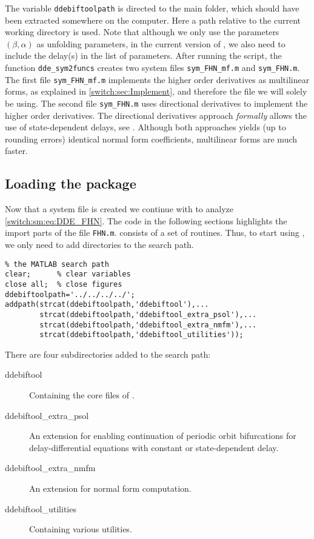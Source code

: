 The variable \lstinline|ddebiftoolpath| is directed to the \DDEBIFTOOL main folder, which should have been extracted somewhere on the computer. Here a path relative to the current working directory is used. Note that although we only use the parameters $(\beta,\alpha)$ as unfolding parameters, in the current version of \DDEBIFTOOL, we also need to include the delay(s) in the list of parameters. After running the script, the function \lstinline|dde_sym2funcs| creates two system files \lstinline|sym_FHN_mf.m| and \lstinline|sym_FHN.m|. The first file \lstinline|sym_FHN_mf.m| implements the higher order derivatives as multilinear forms, as explained in \cref{switch:sec:Implement}, and therefore the file we will solely be using. The second file \lstinline|sym_FHN.m| uses directional derivatives to implement the higher order derivatives. The directional derivatives approach \emph{formally} allows the use of state-dependent delays, see \cite{Sieber@2017}. Although both approaches yields (up to rounding errors) identical normal form coefficients, multilinear forms are much faster.

\subsection{Loading the \DDEBIFTOOL package}\label{switch:sm:sec:loading_DDE-BIFTool}
Now that a system file is created we continue with \DDEBIFTOOL to analyze \cref{switch:sm:eq:DDE_FHN}. The code in the following sections highlights the import parts of the file \lstinline|FHN.m|.
\DDEBIFTOOL consists of a set of \MATLAB routines. Thus, to start using \DDEBIFTOOL, we only need to add \DDEBIFTOOL directories to the search path.
\begin{lstlisting}[style=customMatlab,caption=Add \DDEBIFTOOL scripts to the search path, label={switch:sm:lst:searchpath}]
%% Clean workspace and add DDE-BifTool scripts to 
% the MATLAB search path
clear;      % clear variables
close all;  % close figures
ddebiftoolpath='../../../../';
addpath(strcat(ddebiftoolpath,'ddebiftool'),...
        strcat(ddebiftoolpath,'ddebiftool_extra_psol'),...
        strcat(ddebiftoolpath,'ddebiftool_extra_nmfm'),...
        strcat(ddebiftoolpath,'ddebiftool_utilities'));
\end{lstlisting}
There are four subdirectories added to the search path:
\par
\medskip
\begin{description}
\item[ddebiftool] Containing the core files of \DDEBIFTOOL.
\item[ddebiftool\_extra\_psol] An extension for enabling continuation of periodic orbit bifurcations for delay-differential equations with constant or state-dependent delay.
\item[ddebiftool\_extra\_nmfm] An extension for normal form computation.
\item[ddebiftool\_utilities] Containing various utilities.
\end{description}

